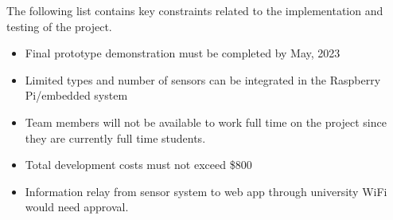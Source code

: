 The following list contains key constraints related to the implementation and testing of the project.

\begin{itemize}
  \item Final prototype demonstration must be completed by May, 2023
  \item Limited types and number of sensors can be integrated in the Raspberry Pi/embedded system
  \item Team members will not be available to work full time on the project since they are currently full time students.
  \item Total development costs must not exceed \$800
  \item Information relay from sensor system to web app through university WiFi would need approval.
\end{itemize}

